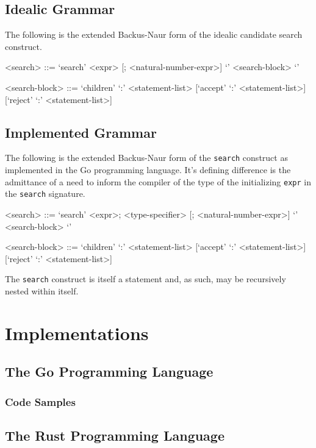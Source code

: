 \documentclass[runningheads]{llncs}
\newcommand{\code}[1]{\texttt{#1}}
\begin{document}
\subsection{Idealic Grammar}
The following is the extended Backus-Naur form of the idealic candidate search construct.
\begin{grammar}
<search> ::= `search' <expr> [; <natural-number-expr>] `{' <search-block> `}'

<search-block> ::= `children' `:' <statement-list> [`accept' `:' <statement-list>][`reject' `:' <statement-list>]
\end{grammar}

\subsection{Implemented Grammar}
The following is the extended Backus-Naur form of the \code{search} construct as implemented in the Go programming language. It's defining difference is the admittance of a need to inform the compiler of the type of the initializing \code{expr} in the \code{search} signature.

\begin{grammar}
<search> ::= `search' <expr>; <type-specifier> [; <natural-number-expr>] `{' <search-block> `}'

<search-block> ::= `children' `:' <statement-list> [`accept' `:' <statement-list>][`reject' `:' <statement-list>]
\end{grammar}

The \code{search} construct is itself a statement and, as such, may be recursively nested within itself.

\section{Implementations}

\subsection{The Go Programming Language}

\subsubsection{Code Samples}

\subsection{The Rust Programming Language}
\end{document}
